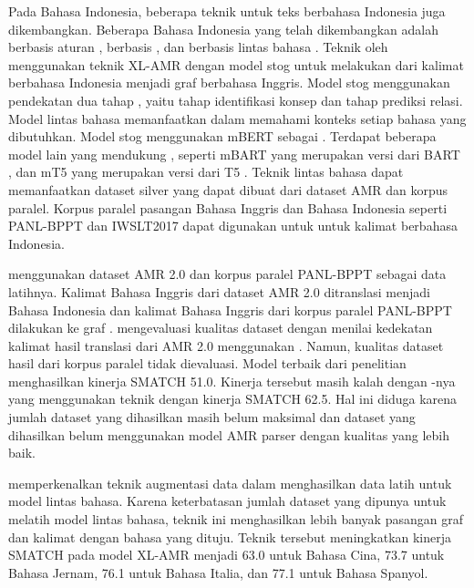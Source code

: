 Pada Bahasa Indonesia, beberapa teknik \amrparsing{} untuk teks berbahasa Indonesia juga dikembangkan.
Beberapa \amrparsing{} Bahasa Indonesia yang telah dikembangkan adalah \amrparsing{} berbasis aturan , berbasis  , dan berbasis lintas bahasa .
Teknik \amrparsing{} oleh \textcite{putra2022} menggunakan teknik  \gls{XL-AMR}  dengan model \gls{stog}  untuk melakukan \amrparsing{} dari kalimat berbahasa Indonesia menjadi graf \AMR{} berbahasa Inggris.
Model \gls{stog} menggunakan pendekatan dua tahap , yaitu tahap identifikasi konsep dan tahap prediksi relasi.
Model \amrparsing{} lintas bahasa memanfaatkan \mwordem{} dalam memahami konteks setiap bahasa yang dibutuhkan.
Model \gls{stog} menggunakan mBERT  sebagai \mwordem{}.
Terdapat beberapa model lain yang mendukung \mwordem{}, seperti mBART  yang merupakan versi \multil{} dari \gls{BART} , dan mT5  yang merupakan versi \multil{} dari T5 .
Teknik \amrparsing{} lintas bahasa dapat memanfaatkan dataset silver yang dapat dibuat dari dataset AMR dan korpus paralel.
Korpus paralel pasangan Bahasa Inggris dan Bahasa Indonesia seperti PANL-BPPT  dan IWSLT2017  dapat digunakan untuk \amrparsing{} untuk kalimat berbahasa Indonesia.

\textcite{putra2022} menggunakan dataset AMR 2.0 dan korpus paralel PANL-BPPT sebagai data latihnya.
Kalimat Bahasa Inggris dari dataset AMR 2.0 ditranslasi menjadi Bahasa Indonesia dan kalimat Bahasa Inggris dari korpus paralel PANL-BPPT dilakukan  ke graf \AMR{}.
\textcite{putra2022} mengevaluasi kualitas dataset dengan menilai kedekatan kalimat hasil translasi dari AMR 2.0 menggunakan \cossim{}.
Namun, kualitas dataset hasil \amrparsing{} dari korpus paralel tidak dievaluasi.
Model terbaik dari penelitian \textcite{putra2022} menghasilkan kinerja SMATCH 51.0.
Kinerja tersebut masih kalah dengan -nya yang menggunakan teknik  dengan kinerja SMATCH 62.5.
Hal ini diduga karena jumlah dataset yang dihasilkan masih belum maksimal dan dataset yang dihasilkan belum menggunakan model AMR parser dengan kualitas yang lebih baik.

\textcite{lee2022} memperkenalkan teknik augmentasi data dalam menghasilkan data latih untuk model \amrparsing{} lintas bahasa.
Karena keterbatasan jumlah dataset yang dipunya untuk melatih model \amrparsing{} lintas bahasa, teknik ini menghasilkan lebih banyak pasangan graf \AMR{} dan kalimat dengan bahasa yang dituju.
Teknik tersebut meningkatkan kinerja SMATCH pada model XL-AMR  menjadi 63.0 untuk Bahasa Cina, 73.7 untuk Bahasa Jernam, 76.1 untuk Bahasa Italia, dan 77.1 untuk Bahasa Spanyol.

